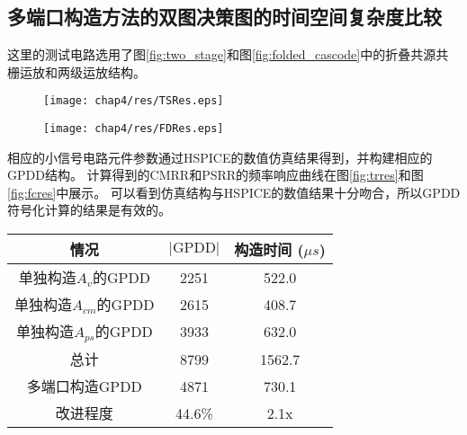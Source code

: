 \subsection{多端口构造方法的双图决策图的时间空间复杂度比较}
\label{subsec:cmps:test:scale}

这里的测试电路选用了图\ref{fig:two_stage}和图\ref{fig:folded_cascode}中的折叠共源共栅运放和两级运放结构。

\begin{figure}[!htp]
	\centering
	\texttt{[image: chap4/res/TSRes.eps]}
\end{figure}

\begin{figure}[!htp]
	\centering
	\texttt{[image: chap4/res/FDRes.eps]}
\end{figure}

相应的小信号电路元件参数通过HSPICE的数值仿真结果得到，并构建相应的GPDD结构。
计算得到的CMRR和PSRR的频率响应曲线在图\ref{fig:trres}和图\ref{fig:fcres}中展示。
可以看到仿真结构与HSPICE的数值结果十分吻合，所以GPDD符号化计算的结果是有效的。

\begin{table}[!htp]
	\centering
	\begin{tabular}{*{3}{c}}
		\hline
		       情况         & $|\mbox{GPDD}|$ & 构造时间 ($\mu s$) \\ \hline
		 单独构造$A_v$的GPDD   &      2251       &     522.0      \\
		单独构造$A_{cm}$的GPDD &      2615       &     408.7      \\
		单独构造$A_{ps}$的GPDD &      3933       &     632.0      \\
		       总计         &      8799       &     1562.7     \\ \hline
		    多端口构造GPDD     &      4871       &     730.1      \\ \hline
		      改进程度        &     44.6\%      &      2.1x      \\ \hline
	\end{tabular}
\end{table}

